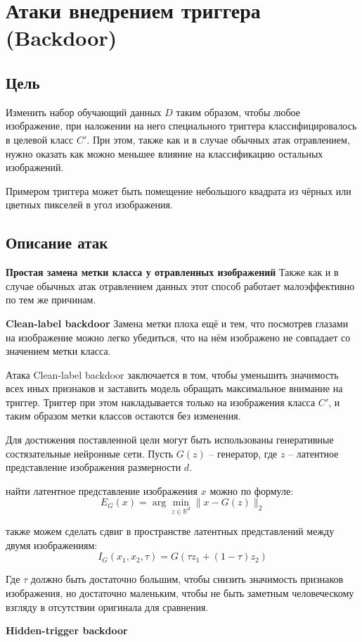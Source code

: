 \section{Атаки внедрением триггера (Backdoor)}
\subsection*{Цель}
Изменить набор обучающий данных $D$ таким образом, чтобы любое изображение, при наложении на него специального триггера классифицировалось в целевой класс $C'$.
При этом, также как и в случае обычных атак отравлением, нужно оказать как можно меньшее влияние на классификацию остальных изображений.

Примером триггера может быть помещение небольшого квадрата из чёрных или цветных пикселей в угол изображения.

\subsection*{Описание атак}

\textbf{Простая замена метки класса у отравленных изображений}
Также как и в случае обычных атак отравлением данных этот способ работает малоэффективно по тем же причинам.

\textbf{Clean-label backdoor}
Замена метки плоха ещё и тем, что посмотрев глазами на изображение можно легко убедиться, что на нём изображено не совпадает со значением метки класса.

Атака Clean-label backdoor заключается в том, чтобы уменьшить значимость всех иных признаков и заставить модель обращать максимальное внимание на триггер. Триггер при этом накладывается только на изображения класса $C'$, и таким образом метки классов остаются без изменения.

Для достижения поставленной цели могут быть использованы генеративные состязательные нейронные сети.
Пусть $G(z)$ – генератор, где $z$ – латентное представление изображения размерности $d$.

 найти латентное представление изображения $x$ можно по формуле:
$$E_{G}(x)=\arg \min _{z \in \mathbb{R}^{d}}\|x-G(z)\|_{2}$$

 также можем сделать сдвиг в пространстве латентных представлений между двумя изображениям:
$$I_{G}\left(x_{1}, x_{2}, \tau\right)=G\left(\tau z_{1}+(1-\tau) z_{2}\right)$$

Где $\tau$ должно быть достаточно большим, чтобы снизить значимость признаков изображения, но достаточно маленьким, чтобы не быть заметным человеческому взгляду в отсутствии оригинала для сравнения.


\textbf{Hidden-trigger backdoor}


